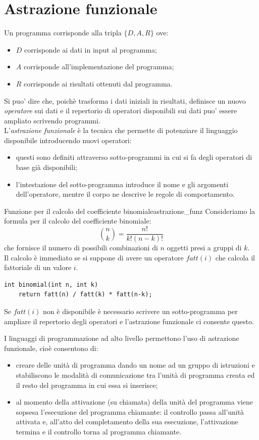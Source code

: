 \documentclass[12pt]{report}
\newcommand{\nmu}{}
\begin{document}
	\section{Astrazione funzionale}
	Un programma corrisponde alla tripla $\{D, A, R\}$ ove:
	\begin{itemize}
		\item $D$ corrisponde ai dati in input al programma;
		\item $A$ corrisponde all'implementazione del programma;
		\item $R$ corrisponde ai risultati ottenuti dal programma.
	\end{itemize}
	Si puo' dire che, poichè trasforma i dati iniziali in risultati, definisce un nuovo \textit{operatore} sui dati e il repertorio di operatori disponibili sui dati puo' essere ampliato scrivendo programmi. \\
	L'\textit{astrazione funzionale} è la tecnica che permette di potenziare il linguaggio disponibile introducendo nuovi operatori:
	\begin{itemize}
		\item questi sono definiti attraverso sotto-programmi in cui si fa degli operatori di base già disponibili;
		\item l'intestazione del sotto-programma introduce il nome e gli argomenti dell'operatore, mentre il corpo ne descrive le regole di comportamento.
	\end{itemize}
	\begin{example}{\nmu Funzione per il calcolo del coefficiente binomiale}{astrazione_funz}
		Consideriamo la formula per il calcolo del coefficiente binomiale:
		\[
		\binom{n}{k} = \frac{n!}{k!(n-k)!}
		\]
		che fornisce il numero di possibili combinazioni di $n$ oggetti presi a gruppi di $k$. \\
		Il calcolo è immediato se si suppone di avere un operatore $fatt(i)$ che calcola il fattoriale di un valore $i$.
		\begin{lstlisting}[style=pascalstyle]
int binomial(int n, int k)
	return fatt(n) / fatt(k) * fatt(n-k);
\end{lstlisting}
		Se $fatt(i)$ non è disponibile è necessario scrivere un sotto-programma per ampliare il repertorio degli operatori e l'astrazione funzionale ci consente questo.
	\end{example}
	I linguaggi di programmazione ad alto livello permettono l'uso di astrazione funzionale, cioè consentono di:
	\begin{itemize}
		\item creare delle unità di programma dando un nome ad un gruppo di istruzioni e stabiliscono le modalità di comunicazione tra l'unità di programma creata ed il resto del programma in cui essa si inserisce;
		\item al momento della attivazione (su chiamata) della unità del programma viene sopsesa l'esecuzione del programma chiamante: il controllo passa all'unità attivata e, all'atto del completamento della sua esecuzione, l'attivazione termina e il controllo torna al programma chiamante.
	\end{itemize}
\end{document}
